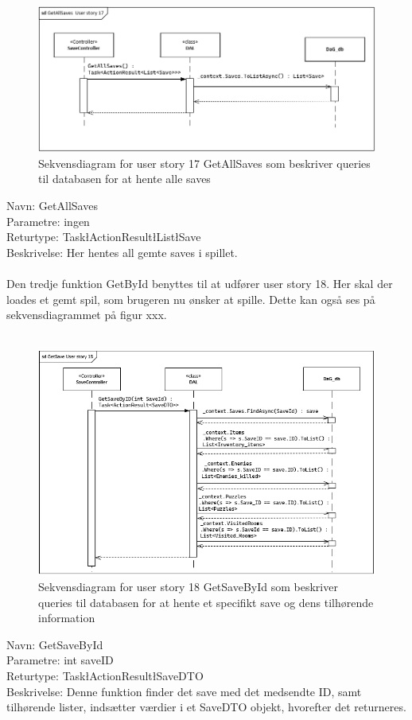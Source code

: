 \begin{figure}[H]
\centering
\includegraphics[width = \textwidth]{02-Body/Images/DAL-Database/GetSavesSd.PNG}
\caption{Sekvensdiagram for user story 17 GetAllSaves som beskriver queries til databasen for at hente alle saves}
\label{fig:DAL-Sekvens-17}
\end{figure}

Navn: GetAllSaves\\
Parametre: ingen\\
Returtype: Task\l ActionResult\l List\l Save\g\g\g \\
Beskrivelse: Her hentes all gemte saves i spillet.\\\\

Den tredje funktion GetById benyttes til at udfører user story 18.
Her skal der loades et gemt spil, som brugeren nu ønsker at spille. 
Dette kan også ses på sekvensdiagrammet på figur xxx.\\\\

\begin{figure}[H]
\centering
\includegraphics[width = \textwidth]{02-Body/Images/DAL-Database/GetSavesByIdSd.PNG}
\caption{Sekvensdiagram for user story 18 GetSaveById som beskriver queries til databasen for at hente et specifikt save og dens tilhørende information}
\label{fig:DAL-Sekvens-18}
\end{figure}

Navn: GetSaveById \\
Parametre: int saveID\\
Returtype: Task\l ActionResult\l SaveDTO\g\g\\
Beskrivelse: Denne funktion finder det save med det medsendte ID, samt tilhørende lister, indsætter værdier i et SaveDTO objekt, hvorefter det returneres.\\